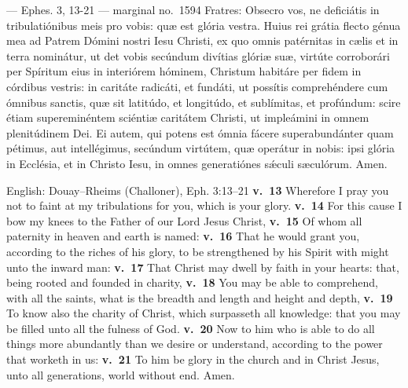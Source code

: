 \begin{appointedlatin}{ --- Ephes. 3, 13-21 --- marginal no.\ 1594}
Fratres: Obsecro vos, ne deficiátis in tribulatiónibus meis pro vobis: quæ est
glória vestra. Huius rei grátia flecto génua mea ad Patrem Dómini nostri Iesu
Christi, ex quo omnis patérnitas in cælis et in terra nominátur, ut det vobis
secúndum divítias glóriæ suæ, virtúte corroborári per Spíritum eius in
interiórem hóminem, Christum habitáre per fidem in córdibus vestris: in
caritáte radicáti, et fundáti, ut possítis comprehéndere cum ómnibus sanctis,
quæ sit latitúdo, et longitúdo, et sublímitas, et profúndum: scire étiam
supereminéntem sciéntiæ caritátem Christi, ut impleámini in omnem plenitúdinem
Dei. Ei autem, qui potens est ómnia fácere superabundánter quam pétimus, aut
intellégimus, secúndum virtútem, quæ operátur in nobis: ipsi glória in
Ecclésia, et in Christo Iesu, in omnes generatiónes sǽculi sæculórum. Amen.
\end{appointedlatin}

\begin{namedtranslation}{English: Douay--Rheims (Challoner), Eph. 3:13--21}
\textbf{v.~13} Wherefore I pray you not to faint at my tribulations for you,
which is your glory. \textbf{v.~14} For this cause I bow my knees to the Father
of our Lord Jesus Christ, \textbf{v.~15} Of whom all paternity in heaven and
earth is named: \textbf{v.~16} That he would grant you, according to the riches
of his glory, to be strengthened by his Spirit with might unto the inward man:
\textbf{v.~17} That Christ may dwell by faith in your hearts: that, being
rooted and founded in charity, \textbf{v.~18} You may be able to comprehend,
with all the saints, what is the breadth and length and height and depth,
\textbf{v.~19} To know also the charity of Christ, which surpasseth all
knowledge: that you may be filled unto all the fulness of God. \textbf{v.~20}
Now to him who is able to do all things more abundantly than we desire or
understand, according to the power that worketh in us: \textbf{v.~21} To him be
glory in the church and in Christ Jesus, unto all generations, world without
end. Amen.
\end{namedtranslation}


